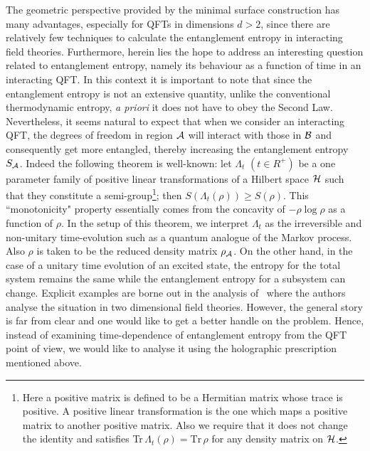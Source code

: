\documentclass[12pt]{article}
\def\CA{{\cal A}}
\def\CB{{\cal B}}
\def\rA{\CA}
\def\rB{\CB}
\begin{document}
The geometric perspective provided by the minimal surface
construction has many advantages,  especially for QFTs in dimensions
$d > 2$, since there are relatively few techniques to calculate the
entanglement entropy in interacting field theories. Furthermore,
herein lies the hope to address an interesting question related to
entanglement entropy, namely its behaviour as a function of time in
an interacting QFT.  In this context it is important to note that
since the entanglement entropy is not an extensive quantity, unlike
the conventional thermodynamic entropy, {\it a priori}  it does not
have to obey the Second Law. Nevertheless, it seems natural to
expect that when we consider an interacting QFT, the degrees of
freedom in region $\rA$ will interact with those in $\rB$ and
consequently get more entangled, thereby increasing the entanglement
entropy $S_\rA$.   Indeed the following theorem is well-known: let
$\Lambda_t$ $(t\in R^+)$ be a one parameter family of positive
linear  transformations of a Hilbert space ${\cal{H}}$ such that
they constitute a semi-group\footnote{Here a positive matrix is
defined to be a Hermitian matrix whose trace is positive. A positive
linear transformation is the one which maps a positive matrix to
another positive matrix. Also we require that it does not change the
identity and satisfies Tr$\,\Lambda_t(\rho)=\mbox{Tr}\,\rho$ for any
density matrix on ${\cal{H}}$.}; then $S(\Lambda_t(\rho))\geq
S(\rho)$. This ``monotonicity" property essentially comes from the
concavity of $-\rho\log\rho$ as a function of $\rho$. In the setup
of this theorem, we interpret $\Lambda_t$ as the irreversible and
non-unitary time-evolution such as a  quantum analogue of the Markov
process. Also $\rho$ is taken to be the reduced density matrix
$\rho_{\rA}$. On the other hand, in the case of a unitary time
evolution of an excited state, the entropy for the total system
remains the same while the entanglement entropy for a subsystem can
change. Explicit examples are borne out in the analysis
of~\cite{Calabrese:2005in} where the authors analyse the situation
in two dimensional field theories. However, the general story is far
from clear and one would like to get a better handle on the problem.
Hence, instead of examining time-dependence of entanglement entropy
from the QFT point of view, we would like to analyse it using the
holographic prescription mentioned above.
\end{document}
